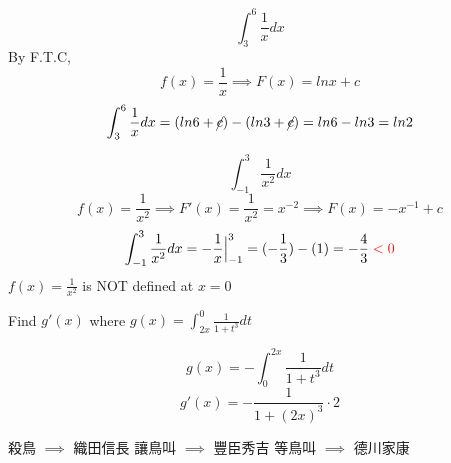 \begin{eg}
$$\displaystyle \int_3^6 \frac{1}{x} dx$$
By F.T.C, $$\displaystyle f(x) = \frac{1}{x} \implies F(x) = ln x + c$$
$$\displaystyle \int_3^6 \frac{1}{x} dx = (ln6 + \cancel{c}) - (ln3 + \cancel{c}) = ln6 - ln3 = ln2$$
\end{eg}
\begin{eg}
$$\displaystyle \int_{-1}^3 \frac{1}{x^2} dx$$
$$\displaystyle f(x) = \frac{1}{x^2} \implies F'(x) = \frac{1}{x^2} = x^{-2} \implies F(x) = -x^{-1} + c$$
$$\displaystyle \int_{-1}^3 \frac{1}{x^2} dx = -\frac{1}{x} \Big| _{-1}^3 = (-\frac{1}{3}) - (1) = - \frac{4}{3} \color{red}<0 $$
$\displaystyle f(x) = \frac{1}{x^2}$ is NOT defined at $x=0$
\end{eg}
\begin{eg}
Find $g'(x)$ where $\displaystyle g(x) = \int_{2x}^0 \frac{1}{1+t^3}dt$

\soln
$$\displaystyle g(x) = - \int_0^{2x} \frac{1}{1+t^3} dt$$
$$\displaystyle g'(x) = - \frac{1}{1+(2x)^3} \cdot 2$$
\end{eg}
\begin{jk}[本書特有題]
殺鳥 $\implies$ 織田信長 \quad 讓鳥叫 $\implies$ 豐臣秀吉 \quad 等鳥叫 $\implies$ 德川家康
\end{jk}
